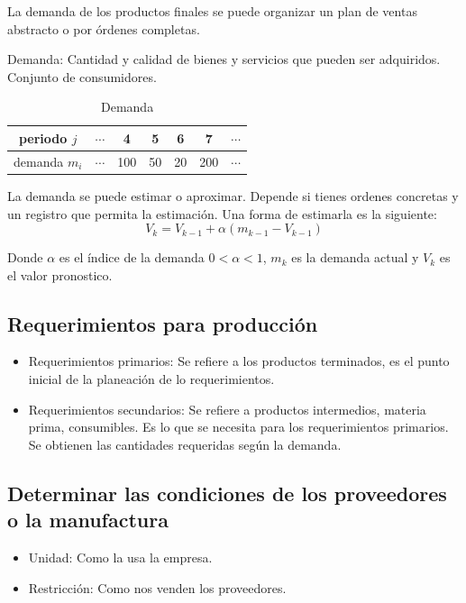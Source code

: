 La demanda de los productos finales se puede organizar un plan de ventas abstracto o por órdenes completas. 

Demanda: Cantidad y calidad de bienes y servicios que pueden ser adquiridos. Conjunto de consumidores. 

\begin{table}[h]
    \centering
    \begin{tabular}{|c|c|c|c|c|c|c}
        \hline
        periodo \( j \) & \( \cdots \) & 4 & 5 & 6 & 7 & \( \cdots \) \\
        \hline
        demanda \( m_{i} \) & \( \cdots \) & 100 & 50 & 20 & 200 & \( \cdots \) \\
        \hline
    \end{tabular}
    \caption{Demanda}
\end{table}

La demanda se puede estimar o aproximar. Depende si tienes ordenes concretas y un registro que permita la estimación. Una forma de estimarla es la siguiente:
\[
    V_{k} = V_{k-1} + \alpha (m_{k-1} - V_{k-1})
\]

Donde \( \alpha \) es el índice de la demanda \( 0 < \alpha < 1 \), \( m_{k} \) es la demanda actual y \( V_{k} \) es el valor pronostico. 

\subsection{Requerimientos para producción}
\begin{itemize}
    \item Requerimientos primarios: Se refiere a los productos terminados, es el punto inicial de la planeación de lo requerimientos.
    
    \item Requerimientos secundarios: Se refiere a productos intermedios, materia prima, consumibles. Es lo que se necesita para los requerimientos primarios. Se obtienen las cantidades requeridas según la demanda. 
\end{itemize}

\subsection{Determinar las condiciones de los proveedores o la manufactura}

\begin{itemize}
    \item Unidad: Como la usa la empresa.
    \item Restricción: Como nos venden los proveedores.
\end{itemize}


